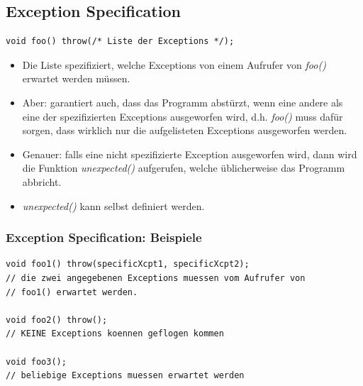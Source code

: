 \subsection{Exception Specification}
\begin{minipage}{0.6\linewidth}
\vspace{-\baselineskip}
\begin{lstlisting}
void foo() throw(/* Liste der Exceptions */);
\end{lstlisting}
\end{minipage}
\begin{itemize}
	\item Die Liste spezifiziert, welche Exceptions von einem Aufrufer von \emph{foo()} erwartet werden müssen.
	\item Aber: garantiert auch, dass das Programm abstürzt, wenn eine andere als eine der spezifizierten Exceptions ausgeworfen wird, d.h. \emph{foo()} muss dafür sorgen, dass wirklich nur die aufgelisteten Exceptions ausgeworfen werden.
	\item Genauer: falls eine nicht spezifizierte Exception ausgeworfen wird, dann wird die Funktion \emph{unexpected()} aufgerufen, welche üblicherweise das Programm abbricht.
	\item \emph{unexpected()} kann selbst definiert werden.
\end{itemize}
\vfill
\pagebreak\newpage

\subsubsection{Exception Specification: Beispiele}
\begin{minipage}{0.7\linewidth}
\vspace{-\baselineskip}
\begin{lstlisting}
void foo1() throw(specificXcpt1, specificXcpt2);
// die zwei angegebenen Exceptions muessen vom Aufrufer von
// foo1() erwartet werden.

void foo2() throw();
// KEINE Exceptions koennen geflogen kommen

void foo3();
// beliebige Exceptions muessen erwartet werden
\end{lstlisting}
\end{minipage}

